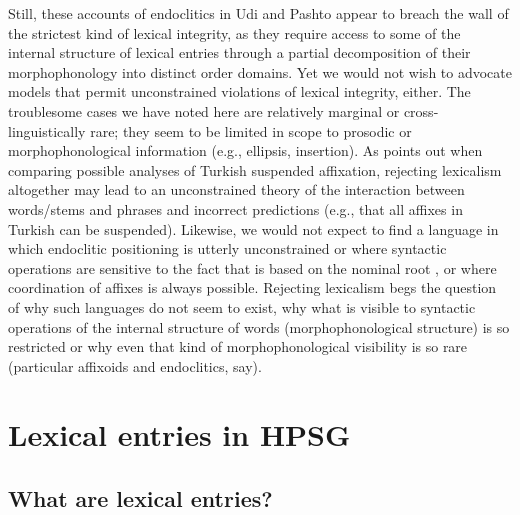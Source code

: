 \documentclass[output=paper
                ,modfonts
                ,nonflat
	        ,collection
	        ,collectionchapter
	        ,collectiontoclongg
 	        ,biblatex
                ,babelshorthands
                ,newtxmath
                ,draftmode
                ,colorlinks, citecolor=brown
]{./langsci/langscibook}
\begin{document}
{Still, these accounts of endoclitics in Udi and Pashto appear to breach the wall of the strictest kind of lexical integrity, as they require access to some of the internal structure of lexical entries through a partial decomposition of their morphophonology into distinct order domains. Yet we would not wish to advocate models that permit unconstrained violations of lexical integrity, either. The troublesome cases we have noted here are relatively marginal or cross-linguistically rare; they seem to be limited in scope to prosodic or morphophonological information (e.g., ellipsis, insertion). As \citet{Broadwell2008} points out when comparing possible analyses of Turkish suspended affixation, rejecting lexicalism altogether may lead to an unconstrained theory of the interaction between words/stems and phrases and incorrect predictions (e.g., that all affixes in Turkish can be suspended). Likewise, we would not expect to find a language in which endoclitic positioning is utterly unconstrained or where syntactic operations are sensitive to the fact that  is based on the nominal root , or where coordination of affixes is always possible. Rejecting lexicalism begs the question of why such languages do not seem to exist, why what is visible to syntactic operations of the internal structure of words (morphophonological structure) is so restricted or why even that kind of morphophonological visibility is so rare (particular affixoids and endoclitics, say).


\section{Lexical entries in HPSG}

\subsection{What are lexical entries?}

}
\end{document}
